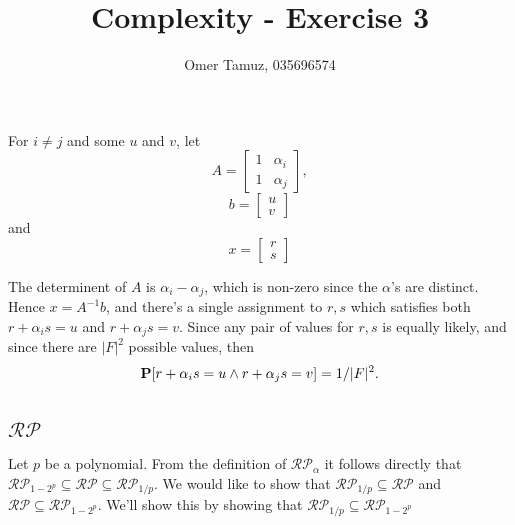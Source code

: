 \documentclass[11pt]{article} \usepackage{amssymb}
\begin{document}
\title{Complexity - Exercise 3}

 \author{Omer Tamuz, 035696574}
\maketitle


\section{}
    For $i\neq j$ and some $u$ and $v$, let 
    \begin{equation*}
      A=
      \begin{bmatrix}
        1& \alpha_i\\ 
        1& \alpha_j
      \end{bmatrix},
    \end{equation*}
    \begin{equation*}
      b=
      \begin{bmatrix}
        u\\ 
        v
      \end{bmatrix}
    \end{equation*}
    and
    \begin{equation*}
      x=
      \begin{bmatrix}
        r\\ 
        s
      \end{bmatrix}
    \end{equation*}

    The determinent of $A$ is $\alpha_i-\alpha_j$, which is
    non-zero since the $\alpha$'s are distinct. Hence $x=A^{-1}b$, and there's
    a single assignment to $r,s$ which satisfies both $r+\alpha_is=u$ and
    $r+\alpha_js=v$. Since any pair of values for $r,s$ is equally likely, and
    since there are $|F|^2$ possible values, then
    $$\P[r+\alpha_is=u \wedge r+\alpha_js=v]=1/|F|^2.$$
\section{}
\subsection{$\mathcal{RP}$}
Let $p$ be a polynomial.
From the definition of $\mathcal{RP}_\alpha$ it follows directly that 
$\mathcal{RP}_{1-2^p}  \subseteq \mathcal{RP} \subseteq \mathcal{RP}_{1/p}$. 
We would like to show that 
$\mathcal{RP}_{1/p} \subseteq \mathcal{RP}$ and $\mathcal{RP} \subseteq \mathcal{RP}_{1-2^p}$. We'll show this by showing that 
$\mathcal{RP}_{1/p} \subseteq \mathcal{RP}_{1-2^p}$
\end{document}
